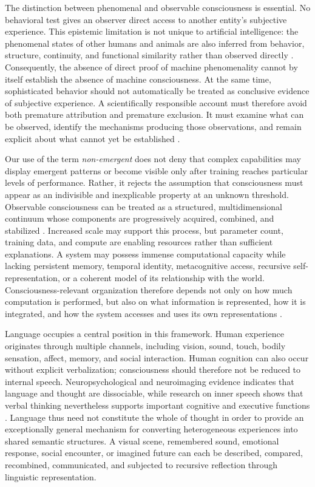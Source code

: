The distinction between phenomenal and observable consciousness is essential. No behavioral test gives an observer direct access to another entity's subjective experience. This epistemic limitation is not unique to artificial intelligence: the phenomenal states of other humans and animals are also inferred from behavior, structure, continuity, and functional similarity rather than observed directly \cite{nagel1974what,chalmers1995facing}. Consequently, the absence of direct proof of machine phenomenality cannot by itself establish the absence of machine consciousness. At the same time, sophisticated behavior should not automatically be treated as conclusive evidence of subjective experience. A scientifically responsible account must therefore avoid both premature attribution and premature exclusion. It must examine what can be observed, identify the mechanisms producing those observations, and remain explicit about what cannot yet be established \cite{butlin2023consciousness,chalmers2023llm}.

Our use of the term \emph{non-emergent} does not deny that complex capabilities may display emergent patterns or become visible only after training reaches particular levels of performance. Rather, it rejects the assumption that consciousness must appear as an indivisible and inexplicable property at an unknown threshold. Observable consciousness can be treated as a structured, multidimensional continuum whose components are progressively acquired, combined, and stabilized \cite{bayne2016levels}. Increased scale may support this process, but parameter count, training data, and compute are enabling resources rather than sufficient explanations. A system may possess immense computational capacity while lacking persistent memory, temporal identity, metacognitive access, recursive self-representation, or a coherent model of its relationship with the world. Consciousness-relevant organization therefore depends not only on how much computation is performed, but also on what information is represented, how it is integrated, and how the system accesses and uses its own representations \cite{bengio2017consciousness,butlin2023consciousness}.

Language occupies a central position in this framework. Human experience originates through multiple channels, including vision, sound, touch, bodily sensation, affect, memory, and social interaction. Human cognition can also occur without explicit verbalization; consciousness should therefore not be reduced to internal speech. Neuropsychological and neuroimaging evidence indicates that language and thought are dissociable, while research on inner speech shows that verbal thinking nevertheless supports important cognitive and executive functions \cite{fedorenko2016language,aldersonday2015inner}. Language thus need not constitute the whole of thought in order to provide an exceptionally general mechanism for converting heterogeneous experiences into shared semantic structures. A visual scene, remembered sound, emotional response, social encounter, or imagined future can each be described, compared, recombined, communicated, and subjected to recursive reflection through linguistic representation.

